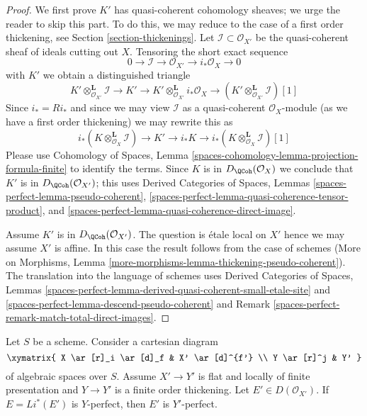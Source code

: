 \begin{proof}
We first prove $K'$ has quasi-coherent cohomology sheaves; we urge
the reader to skip this part.
To do this, we may reduce to the case of a first order thickening, see
Section \ref{section-thickenings}. Let $\mathcal{I} \subset \mathcal{O}_{X'}$
be the quasi-coherent sheaf of ideals cutting out $X$.
Tensoring the short exact sequence
$$
0 \to \mathcal{I} \to \mathcal{O}_{X'} \to i_*\mathcal{O}_X \to 0
$$
with $K'$ we obtain a distinguished triangle
$$
K' \otimes_{\mathcal{O}_{X'}}^\mathbf{L} \mathcal{I}
\to K' \to
K' \otimes_{\mathcal{O}_{X'}}^\mathbf{L} i_*\mathcal{O}_X
\to
(K' \otimes_{\mathcal{O}_{X'}}^\mathbf{L} \mathcal{I})[1]
$$
Since $i_* = Ri_*$ and since we may view $\mathcal{I}$
as a quasi-coherent $\mathcal{O}_X$-module (as we have a first
order thickening) we may rewrite this as
$$
i_*(K \otimes_{\mathcal{O}_X}^\mathbf{L} \mathcal{I})
\to K' \to
i_*K \to
i_*(K \otimes_{\mathcal{O}_X}^\mathbf{L} \mathcal{I})[1]
$$
Please use Cohomology of Spaces, Lemma
\ref{spaces-cohomology-lemma-projection-formula-finite}
to identify the terms. Since $K$ is in
$D_\QCoh(\mathcal{O}_X)$ we conclude that
$K'$ is in $D_\QCoh(\mathcal{O}_{X'})$; this uses
Derived Categories of Spaces, Lemmas
\ref{spaces-perfect-lemma-pseudo-coherent},
\ref{spaces-perfect-lemma-quasi-coherence-tensor-product}, and
\ref{spaces-perfect-lemma-quasi-coherence-direct-image}.

\medskip\noindent
Assume $K'$ is in $D_\QCoh(\mathcal{O}_{X'})$.
The question is \'etale local on $X'$
hence we may assume $X'$ is affine.
In this case the result follows from the case of schemes
(More on Morphisms, Lemma
\ref{more-morphisms-lemma-thickening-pseudo-coherent}).
The translation into the language of schemes uses
Derived Categories of Spaces, Lemmas
\ref{spaces-perfect-lemma-derived-quasi-coherent-small-etale-site} and
\ref{spaces-perfect-lemma-descend-pseudo-coherent} and
Remark \ref{spaces-perfect-remark-match-total-direct-images}.
\end{proof}

\begin{lemma}
\label{lemma-thickening-relatively-perfect}
Let $S$ be a scheme. Consider a cartesian diagram
$$
\xymatrix{
X \ar[r]_i \ar[d]_f & X' \ar[d]^{f'} \\
Y \ar[r]^j & Y'
}
$$
of algebraic spaces over $S$. Assume $X' \to Y'$ is flat and locally
of finite presentation and $Y \to Y'$ is a finite order thickening.
Let $E' \in D(\mathcal{O}_{X'})$. If $E = Li^*(E')$ is $Y$-perfect,
then $E'$ is $Y'$-perfect.
\end{lemma}

